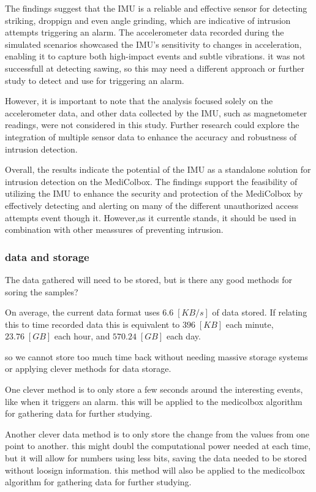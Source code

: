 \documentclass[../main.tex]{subfiles}
\begin{document}
The findings suggest that the IMU is a reliable and
effective sensor for detecting striking, droppign and even angle grinding,
which are indicative of intrusion attempts triggering an alarm.
The accelerometer data recorded during the
simulated scenarios showcased the IMU's sensitivity to
changes in acceleration,
enabling it to capture both high-impact events and
subtle vibrations. it was not successfull at detecting sawing, so this may
need a different approach or further study to detect and use for triggering an alarm.

However, it is important to note that the analysis
focused solely on the accelerometer data,
and other data collected by the IMU,
such as magnetometer readings,
were not considered in this study.
Further research could explore the
integration of multiple sensor data to enhance the
accuracy and robustness of intrusion detection.

Overall, the results indicate the potential of the IMU as
a standalone solution for intrusion detection on the
MediColbox. The findings support the feasibility of
utilizing the IMU to enhance the security and protection of the
MediColbox by effectively detecting and alerting on many of the different
unauthorized access attempts event though it. However,as it currentle stands, it should be used in combination with other meassures of preventing intrusion.

\subsubsection{data and storage}

The data gathered will need to be stored, but is there any good methods for soring the samples?

On average, the current data format uses $6.6\;[KB/s]$ of data stored.
If relating this to time recorded data this is equivalent to $396\;[KB]$ each minute, $23.76\;[GB]$ each hour, and $570.24\;[GB]$ each day.

so we cannot store too much time back without needing massive storage systems or applying clever methods for data storage.

One clever method is to only store a few seconds around the interesting events, like when it triggers an alarm. this will be applied to the medicolbox algorithm for gathering data for further studying.

Another clever data method is to only store the change from the values from one point to another. this might doubl the computational power needed at each time, but it will allow for numbers using less bits, saving the data needed to be stored without loosign information. this method will also be applied to the medicolbox algorithm for gathering data for further studying.
\end{document}
